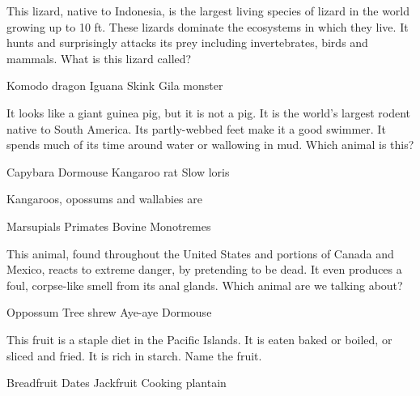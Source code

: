 \documentclass[a4paper,12pt,answers]{exam}
\begin{document}
\begin{questions}
    \question This lizard, native to Indonesia, is the largest living species of lizard in the world growing up to 10 ft. These lizards dominate the ecosystems in which they live. It hunts and surprisingly attacks its prey including invertebrates, birds and mammals. What is this lizard called?

    \begin{randomizeoneparchoices}
        \CorrectChoice Komodo dragon
        \choice Iguana
        \choice Skink
        \choice Gila monster
    \end{randomizeoneparchoices}
    
    \question It looks like a giant guinea pig, but it is not a pig. It is the world's largest rodent native to South America. Its partly-webbed feet make it a good swimmer. It spends much of its time around water or wallowing in mud. Which animal is this?

    \begin{randomizeoneparchoices}
        \CorrectChoice Capybara
        \choice Dormouse
        \choice Kangaroo rat
        \choice Slow loris
    \end{randomizeoneparchoices}
    
    \question Kangaroos, opossums and wallabies are \fillin

    \begin{randomizeoneparchoices}
        \CorrectChoice Marsupials
        \choice Primates
        \choice Bovine
        \choice Monotremes
    \end{randomizeoneparchoices}
    
    \question This animal, found throughout the United States and portions of Canada and Mexico, reacts to extreme danger, by pretending to be dead. It even produces a foul, corpse-like smell from its anal glands. Which animal are we talking about?

    \begin{randomizeoneparchoices}
        \CorrectChoice Oppossum
        \choice Tree shrew
        \choice Aye-aye
        \choice Dormouse
    \end{randomizeoneparchoices}
    
        \question This fruit is a staple diet in the Pacific Islands. It is eaten baked or boiled, or sliced and fried. It is rich in starch. Name the fruit.

    \begin{randomizeoneparchoices}
	    \CorrectChoice Breadfruit
	    \choice Dates
	    \choice Jackfruit
	    \choice Cooking plantain
    \end{randomizeoneparchoices}


\end{questions}
\end{document}
